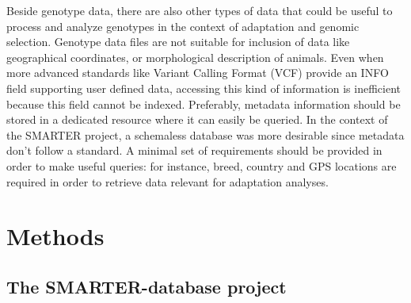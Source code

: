 \documentclass[a4paper,num-refs,gigabyte]{oup-contemporary}
\begin{document}
Beside genotype data, there are also other types of data that could be useful to process and analyze genotypes in the context of adaptation and genomic selection. Genotype data files are not suitable for inclusion of data like geographical  coordinates, or morphological description of animals. Even when more advanced standards like Variant Calling Format (VCF) provide an INFO field supporting user defined data\citep{Danecek2011}, accessing this kind of information is inefficient  because this field cannot be  indexed.  Preferably, metadata information should be stored in a dedicated resource where it can easily be queried. In the context of the SMARTER project, a schemaless database was more desirable since metadata don't follow a standard. A minimal set of requirements should be provided in order to make useful queries: for instance, breed, country and GPS locations are required in order to retrieve data relevant for adaptation analyses.

\section{Methods}

\subsection{The SMARTER-database project}
\end{document}
